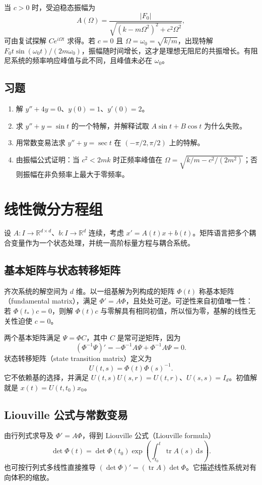 \documentclass[UTF8,12pt,a4paper,fontset=fandol]{ctexbook}
\begin{document}
当 $c>0$ 时，受迫稳态振幅为
\[
 A(\Omega)=\frac{|F_0|}{\sqrt{(k-m\Omega^2)^2+c^2\Omega^2}},
\]
可由复试探解 $Ce^{i\Omega t}$ 求得。若 $c=0$ 且 $\Omega=\omega_0=\sqrt{k/m}$，出现特解 $F_0t\sin(\omega_0t)/(2m\omega_0)$，振幅随时间增长，这才是理想无阻尼的共振增长。有阻尼系统的频率响应峰值与此不同，且峰值未必在 $\omega_0$。

\section{习题}
\begin{enumerate}
 \item\label{ex:ode-constant} 解 $y''+4y=0$、$y(0)=1$、$y'(0)=2$。
 \item\label{ex:ode-resonance} 求 $y''+y=\sin t$ 的一个特解，并解释试取 $A\sin t+B\cos t$ 为什么失败。
 \item 用常数变易法求 $y''+y=\sec t$ 在 $(-\pi/2,\pi/2)$ 上的特解。
 \item 由振幅公式证明：当 $c^2<2mk$ 时正频率峰值在 $\Omega=\sqrt{k/m-c^2/(2m^2)}$；否则振幅在非负频率上最大于零频率。
\end{enumerate}

\chapter{线性微分方程组}
\label{chap:ode-linear-system}

设 $A:I\to\mathbb R^{d\times d}$、$b:I\to\mathbb R^d$ 连续，考虑 $x'=A(t)x+b(t)$。矩阵语言把多个耦合变量作为一个状态处理，并统一高阶标量方程与耦合系统。

\section{基本矩阵与状态转移矩阵}
齐次系统的解空间为 $d$ 维。以一组基解为列构成的矩阵 $\Phi(t)$ 称基本矩阵（fundamental matrix），满足 $\Phi'=A\Phi$，且处处可逆。可逆性来自初值唯一性：若 $\Phi(t_*)c=0$，则解 $\Phi(t)c$ 与零解具有相同初值，所以恒为零，基解的线性无关性迫使 $c=0$。

两个基本矩阵满足 $\Psi=\Phi C$，其中 $C$ 是常可逆矩阵，因为
\[
 (\Phi^{-1}\Psi)'=-\Phi^{-1}A\Psi+\Phi^{-1}A\Psi=0.
\]
状态转移矩阵（state transition matrix）定义为
\[
 U(t,s)=\Phi(t)\Phi(s)^{-1}.
\]
它不依赖基的选择，并满足 $U(t,s)U(s,r)=U(t,r)$、$U(s,s)=I_d$。初值解就是 $x(t)=U(t,t_0)x_0$。

\section{Liouville 公式与常数变易}
由行列式求导及 $\Phi'=A\Phi$，得到 Liouville 公式（Liouville formula）
\[
 \det\Phi(t)=\det\Phi(t_0)\exp\!\left(\int_{t_0}^t\operatorname{tr}A(s)\,\mathrm ds\right).
\]
也可按行列式多线性直接推导 $(\det\Phi)'=(\operatorname{tr}A)\det\Phi$。它描述线性系统对有向体积的缩放。
\end{document}
